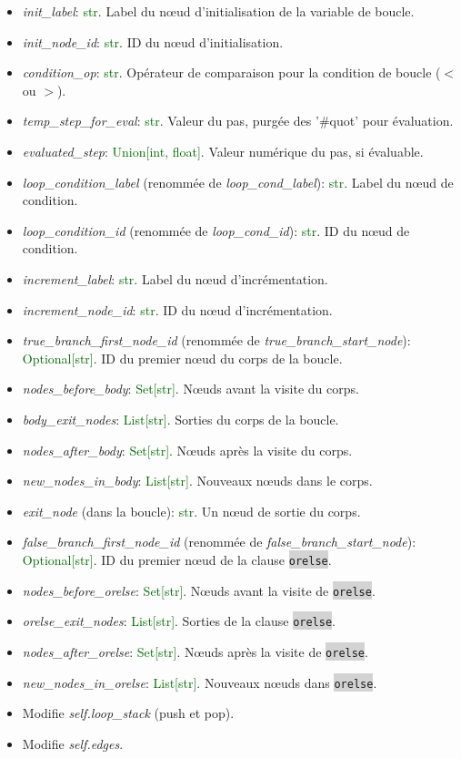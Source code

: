 \documentclass[11pt,a4paper]{article}
\newcommand{\code}[1]{\colorbox{lightgray}{\texttt{\small #1}}}
\newcommand{\var}[1]{\textit{#1}}
\newcommand{\vartype}[1]{\textcolor{darkgreen}{#1}}
\begin{document}
\begin{description}
\begin{itemize}
        \item \var{init\_label}: \vartype{str}. Label du nœud d'initialisation de la variable de boucle.
        \item \var{init\_node\_id}: \vartype{str}. ID du nœud d'initialisation.
        \item \var{condition\_op}: \vartype{str}. Opérateur de comparaison pour la condition de boucle ($<$ ou $>$).
        \item \var{temp\_step\_for\_eval}: \vartype{str}. Valeur du pas, purgée des '\#quot' pour évaluation.
        \item \var{evaluated\_step}: \vartype{Union[int, float]}. Valeur numérique du pas, si évaluable.
        \item \var{loop\_condition\_label} (renommée de \var{loop\_cond\_label}): \vartype{str}. Label du nœud de condition.
        \item \var{loop\_condition\_id} (renommée de \var{loop\_cond\_id}): \vartype{str}. ID du nœud de condition.
        \item \var{increment\_label}: \vartype{str}. Label du nœud d'incrémentation.
        \item \var{increment\_node\_id}: \vartype{str}. ID du nœud d'incrémentation.
        \item \var{true\_branch\_first\_node\_id} (renommée de \var{true\_branch\_start\_node}): \vartype{Optional[str]}. ID du premier nœud du corps de la boucle.
        \item \var{nodes\_before\_body}: \vartype{Set[str]}. Nœuds avant la visite du corps.
        \item \var{body\_exit\_nodes}: \vartype{List[str]}. Sorties du corps de la boucle.
        \item \var{nodes\_after\_body}: \vartype{Set[str]}. Nœuds après la visite du corps.
        \item \var{new\_nodes\_in\_body}: \vartype{List[str]}. Nouveaux nœuds dans le corps.
        \item \var{exit\_node} (dans la boucle): \vartype{str}. Un nœud de sortie du corps.
        \item \var{false\_branch\_first\_node\_id} (renommée de \var{false\_branch\_start\_node}): \vartype{Optional[str]}. ID du premier nœud de la clause \code{orelse}.
        \item \var{nodes\_before\_orelse}: \vartype{Set[str]}. Nœuds avant la visite de \code{orelse}.
        \item \var{orelse\_exit\_nodes}: \vartype{List[str]}. Sorties de la clause \code{orelse}.
        \item \var{nodes\_after\_orelse}: \vartype{Set[str]}. Nœuds après la visite de \code{orelse}.
        \item \var{new\_nodes\_in\_orelse}: \vartype{List[str]}. Nouveaux nœuds dans \code{orelse}.
        \item Modifie \var{self.loop\_stack} (push et pop).
        \item Modifie \var{self.edges}.
    \end{itemize}
\end{description}
\end{document}
